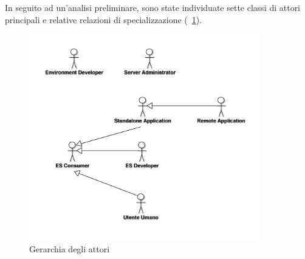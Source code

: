 In seguito ad un'analisi preliminare, sono state individuate sette classi di attori principali e relative relazioni di specializzazione (\figurename~\ref{fig:attori}).

\begin{figure}[h]
\centering
\includegraphics[width=0.9\textwidth]{Immagini/Capitolo2/UseCases/Attori.png}
\caption{Gerarchia degli attori}\label{fig:attori}
\end{figure}

